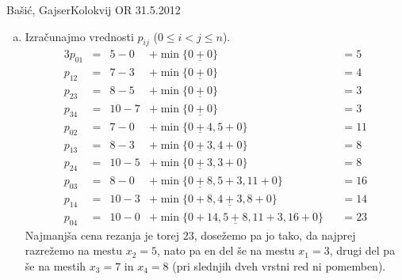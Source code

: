 \begin{naloga}{Bašić, Gajser}{Kolokvij OR 31.5.2012}
\begin{odgovor}
\begin{enumerate}[(a)]
\item Izračunajmo vrednosti $p_{ij}$ ($0 \le i < j \le n$).
\begin{alignat*}{3}
p_{01} &=&  5 - 0 &+ \min\{\underline{0+0}\} &&= 5 \\
p_{12} &=&  7 - 3 &+ \min\{\underline{0+0}\} &&= 4 \\
p_{23} &=&  8 - 5 &+ \min\{\underline{0+0}\} &&= 3 \\
p_{34} &=& 10 - 7 &+ \min\{\underline{0+0}\} &&= 3 \\
p_{02} &=&  7 - 0 &+ \min\{\underline{0+4}, 5+0\} &&= 11 \\
p_{13} &=&  8 - 3 &+ \min\{\underline{0+3}, 4+0\} &&= 8 \\
p_{24} &=& 10 - 5 &+ \min\{\underline{0+3}, 3+0\} &&= 8 \\
p_{03} &=&  8 - 0 &+ \min\{\underline{0+8}, 5+3, 11+0\} &&= 16 \\
p_{14} &=& 10 - 3 &+ \min\{0+8, \underline{4+3}, 8+0\} &&= 14 \\
p_{04} &=& 10 - 0 &+ \min\{0+14, \underline{5+8}, 11+3, 16+0\} &&= 23
\end{alignat*}
Najmanjša cena rezanja je torej $23$, dosežemo pa jo tako,
da najprej razrežemo na mestu $x_2 = 5$,
nato pa en del še na mestu $x_1 = 3$,
drugi del pa še na mestih $x_3 = 7$ in $x_4 = 8$
(pri slednjih dveh vrstni red ni pomemben).
\end{enumerate}
\end{odgovor}
\end{naloga}
